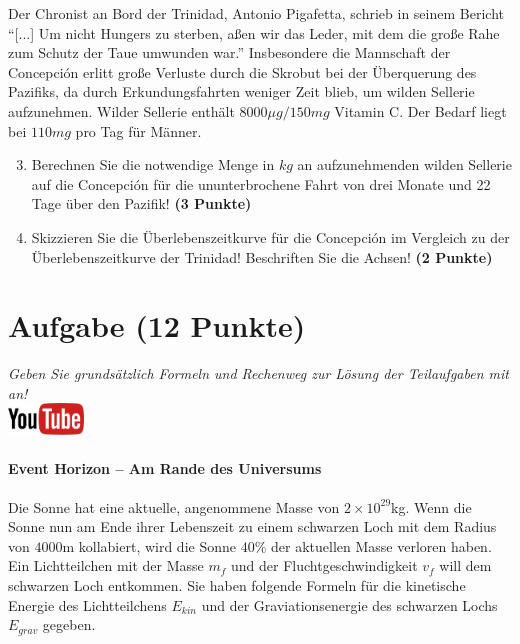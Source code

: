 \documentclass[a4paper, 9pt]{scrartcl}\usepackage[]{graphicx}\usepackage[]{xcolor}
\begin{document}
Der Chronist an Bord der Trinidad, Antonio Pigafetta, schrieb in seinem
Bericht "`[...] Um nicht Hungers zu sterben, a{\ss}en wir das Leder, mit dem
die gro{\ss}e Rahe zum Schutz der Taue umwunden war."' Insbesondere die
Mannschaft der Concepci{\'o}n erlitt gro{\ss}e Verluste durch die Skrobut bei der
{\"U}berquerung des Pazifiks, da durch Erkundungsfahrten weniger Zeit blieb, um
wilden Sellerie aufzunehmen. Wilder Sellerie enth{\"a}lt
$8000\mu g/150mg$ Vitamin C. Der Bedarf liegt bei
$110mg$ pro Tag f{\"u}r M{\"a}nner.

\begin{enumerate}
  \setcounter{enumi}{2}
\item Berechnen Sie die notwendige Menge in $kg$ an
  aufzunehmenden wilden Sellerie auf die Concepci{\'o}n f{\"u}r die ununterbrochene
  Fahrt von drei Monate und 22 Tage {\"u}ber den Pazifik!
  \textbf{(3 Punkte)}
\item Skizzieren Sie die {\"U}berlebenszeitkurve f{\"u}r die Concepci{\'o}n im
  Vergleich zu der {\"U}berlebenszeitkurve der Trinidad! Beschriften Sie die
  Achsen! \textbf{(2 Punkte)}
\end{enumerate}

 
\clearpage

\section{Aufgabe \hfill (12 Punkte)}

\textit{Geben Sie grunds{\"a}tzlich Formeln und Rechenweg zur L{\"o}sung der
  Teilaufgaben mit an!} \\[1Ex]

\hfill\href{https://youtu.be/q-qYK4Chslg}{\includegraphics[width =
  2cm]{img/youtube}} %
\hspace{2Ex}

\paragraph{Event Horizon -- Am Rande des Universums}



Die Sonne hat eine aktuelle, angenommene Masse von $\ensuremath{2\times 10^{29}}$kg. Wenn
die Sonne nun am Ende ihrer Lebenszeit zu einem schwarzen Loch mit dem
Radius von $4000$m kollabiert, wird die Sonne $40$\%
der aktuellen Masse verloren haben. Ein Lichtteilchen mit der Masse $m_f$
und der Fluchtgeschwindigkeit $v_f$ will dem schwarzen Loch entkommen.  Sie
haben folgende Formeln f{\"u}r die kinetische Energie des Lichtteilchens
$E_{kin}$ und der Graviationsenergie des schwarzen Lochs $E_{grav}$
gegeben.
\end{document}
